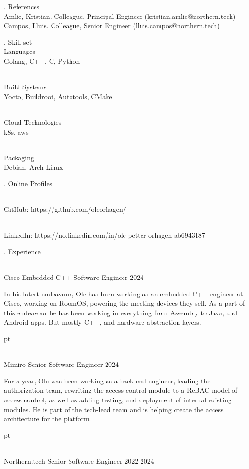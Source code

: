 . {References}
\\ \star Amlie, Kristian. Colleague, Principal Engineer (kristian.amlie@northern.tech)
\\ \star Campos, Lluis. Colleague, Senior Engineer (lluis.campos@northern.tech)

\finishpage

. {Skill set}
\\ Languages:
\\ \star Golang, C++, C, Python

\\ Build Systems
\\ \star Yocto, Buildroot, Autotools, CMake

\\ Cloud Technologies
\\ \star k8s, aws

\\ Packaging
\\ \star Debian, Arch Linux

. {Online Profiles}

\\ \star GitHub: https://github.com/oleorhagen/

\\ \star LinkedIn: https://no.linkedin.com/in/ole-petter-orhagen-ab6943187

. {Experience}

\\ \star Cisco Embedded C++ Software Engineer 2024-

In his latest endeavour, Ole has been working as an embedded C++ engineer at
Cisco, working on RoomOS, powering the meeting devices they sell. As a part of
this endeavour he has been working in everything from Assembly to Java, and
Android apps. But mostly C++, and hardware abstraction layers.

 pt


\\ \star Mimiro Senior Software Engineer 2024-

For a year, Ole was been working as a back-end engineer, leading the
authorization team, rewriting the access control module to a ReBAC model of
access control, as well as adding testing, and deployment of internal existing
modules. He is part of the tech-lead team and is helping create the access
architecture for the platform.

 pt

\\ \star Northern.tech Senior Software Engineer 2022-2024

